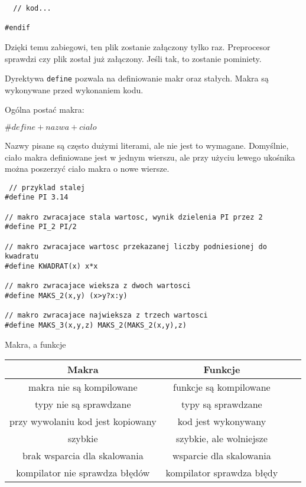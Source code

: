 \documentclass[notheorems, aspectratio=54]{beamer}
\begin{document}
\begin{frame}
\begin{frame}
\begin{lstlisting}
  // kod...

#endif
		\end{lstlisting}
						
		Dzięki temu zabiegowi, ten plik zostanie załączony tylko raz. Preprocesor sprawdzi czy plik został już załączony.
		Jeśli tak, to zostanie pominiety.
	\end{frame}
			
	\begin{frame}
		Dyrektywa \texttt{define} pozwala na definiowanie makr oraz stałych. 
		Makra są wykonywane przed wykonaniem kodu. 
						
		Ogólna postać makra:
						
		$\# define + nazwa + cialo$
						
		Nazwy pisane są często dużymi literami, ale nie jest to wymagane.
		Domyślnie, ciało makra definiowane jest w jednym wierszu, 
		ale przy użyciu lewego ukośnika można poszerzyć ciało makra o nowe wiersze.
						
		\begin{lstlisting}
 // przyklad stalej
#define PI 3.14

// makro zwracajace stala wartosc, wynik dzielenia PI przez 2
#define PI_2 PI/2

// makro zwracajace wartosc przekazanej liczby podniesionej do kwadratu
#define KWADRAT(x) x*x

// makro zwracajace wieksza z dwoch wartosci
#define MAKS_2(x,y) (x>y?x:y)

// makro zwracajace najwieksza z trzech wartosci
#define MAKS_3(x,y,z) MAKS_2(MAKS_2(x,y),z) 
		\end{lstlisting}
		
	\end{frame}
	
	\begin{frame}
		Makra, a funkcje
		
		\begin{center}
			\begin{tabular}{ |c|c|c|c| } 
				\hline
				Makra                             & Funkcje                     \\
				\hline
				makra nie są kompilowane         & funkcje są kompilowane     \\
				typy nie są sprawdzane           & typy są sprawdzane         \\
				przy wywolaniu kod jest kopiowany & kod jest wykonywany         \\
				szybkie                           & szybkie, ale wolniejsze     \\
				brak wsparcia dla skalowania      & wsparcie dla skalowania     \\
				kompilator nie sprawdza błędów & kompilator sprawdza błędy \\
				\hline
			\end{tabular}
		\end{center}
		

\end{frame}
\end{frame}
\end{document}
